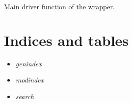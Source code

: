 \documentclass[letterpaper,10pt,english]{sphinxmanual}
\begin{document}

\begin{fulllineitems}
\label{SamPy.wrapper:SamPy.wrapper.gf.main}
Main driver function of the wrapper.

\end{fulllineitems}



\chapter{Indices and tables}
\label{index:indices-and-tables}\begin{itemize}
\item {} 
\emph{genindex}

\item {} 
\emph{modindex}

\item {} 
\emph{search}

\end{itemize}
\end{document}
